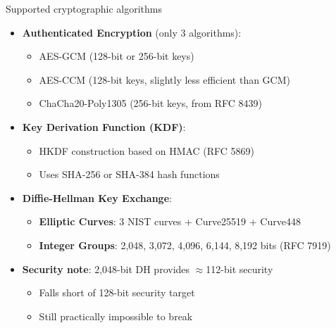 \ifdefined\PRESENTATION\else\PassOptionsToClass{handout}{beamer}\fi\documentclass[aspectratio=169, lualatex]{beamer}
\begin{document}
\begin{frame}{Supported cryptographic algorithms}
	\begin{itemize}
		\item \textbf{Authenticated Encryption} (only 3 algorithms):
		      \begin{itemize}
			      \item AES-GCM (128-bit or 256-bit keys)
			      \item AES-CCM (128-bit keys, slightly less efficient than GCM)
			      \item ChaCha20-Poly1305 (256-bit keys, from RFC 8439)
		      \end{itemize}
		\item \textbf{Key Derivation Function (KDF)}:
		      \begin{itemize}
			      \item HKDF construction based on HMAC (RFC 5869)
			      \item Uses SHA-256 or SHA-384 hash functions
		      \end{itemize}
		\item \textbf{Diffie-Hellman Key Exchange}:
		      \begin{itemize}
			      \item \textbf{Elliptic Curves}: 3 NIST curves + Curve25519 + Curve448
			      \item \textbf{Integer Groups}: 2,048, 3,072, 4,096, 6,144, 8,192 bits (RFC 7919)
		      \end{itemize}
		\item \textbf{Security note}: 2,048-bit DH provides $\approx$112-bit security
		      \begin{itemize}
			      \item Falls short of 128-bit security target
			      \item Still practically impossible to break
		      \end{itemize}
	\end{itemize}
\end{frame}
\end{document}
